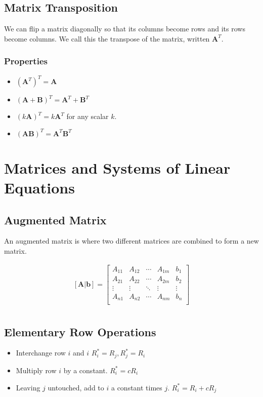 \documentclass[12pt,landscape,twocolumn]{article}
\newcommand{\ma}[0]{\mathbf{A} }        %
\newcommand{\mb}[0]{\mathbf{B} }        %
\begin{document}
    \subsection{Matrix Transposition}
    We can flip a matrix diagonally so that its columns become rows and its rows become columns. We call this the transpose of the matrix, written $\mathbf{A}^T$.
        \subsubsection{Properties}
        \begin{itemize}
            \item ${(\ma^T)}^T = \ma$
            \item ${(\ma + \mb)}^T = \ma^T + \mb^T$
            \item ${(k \ma)}^T = k\ma^T$ for any scalar $k$.
            \item ${(\ma \mb)}^T = \ma^T \mb^T$
        \end{itemize}

\section{Matrices and Systems of Linear Equations}
    \subsection{Augmented Matrix}
    An augmented matrix is where two different matrices are combined to form a new matrix.

    \begin{equation}\label{eq:augmented_matrix}
    \begin{aligned}
        \mathbf{[A|b]}=
        \left[\begin{array}{cccc|c}
        A_{11} & A_{12} & \cdots & A_{1m} & b_1\\
        A_{21} & A_{22} & \cdots & A_{2m} & b_2\\
        \vdots & \vdots & \ddots & \vdots & \vdots\\
        A_{n1} & A_{n2} & \cdots & A_{nm} & b_n\\
        \end{array}\right]\\
    \end{aligned}
    \end{equation}

    \subsection{Elementary Row Operations}
    \begin{itemize}
        \item Interchange row $i$ and $i$
            $ R^*_i = R_j, R^*_j = R_i $
        \item Multiply row $i$ by a constant.
            $ R^*_i = cR_i $
        \item Leaving $j$ untouched, add to $i$ a constant times $j$.
            $ R^*_i = R_i + cR_j $
    \end{itemize}
\end{document}
